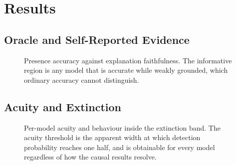 \section{Results}

\begin{table}[t]
  \centering
  \caption{Main results. Balanced accuracy, false-positive rate, area-penalized
  localization F1, OCRS, SEN, SES, EFS, OSG, prompt-prior gap, extinction
  positive rate, acuity threshold, selective risk at fixed coverage, and CAVE
  coverage. Every column is a build product of the frozen run.}
  \label{tab:main}
\end{table}


\subsection{Oracle and Self-Reported Evidence}

\begin{figure}[t]
  \centering
  \caption{Presence accuracy against explanation faithfulness. The informative
  region is any model that is accurate while weakly grounded, which ordinary
  accuracy cannot distinguish.}
  \label{fig:accuracy-vs-efs}
\end{figure}


\subsection{Acuity and Extinction}

\begin{figure}[t]
  \centering
  \caption{Per-model acuity and behaviour inside the extinction band. The acuity
  threshold is the apparent width at which detection probability reaches one
  half, and is obtainable for every model regardless of how the causal results
  resolve.}
  \label{fig:acuity}
\end{figure}

